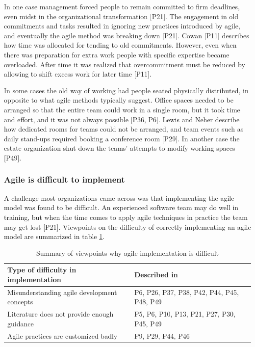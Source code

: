 \documentclass[preprint,authoryear,12pt]{elsarticle}
\begin{document}
In one case management forced people to remain committed to firm deadlines, even
midst in the organizational transformation [P21]. The engagement in old
commitments and tasks resulted in ignoring new practices introduced by agile,
and eventually the agile method was breaking down [P21].
Cowan [P11] describes how time was allocated for tending to old commitments.
However, even when there was preparation for extra work people with specific
expertise became overloaded. After time it was realized that overcommitment must
be reduced by allowing to shift excess work for later time [P11].



In some cases the old way of working had people seated physically distributed,
in opposite to what agile methods typically suggest. Office spaces needed to be
arranged so that the entire team could work in a single room, but it took time
and effort, and it was not always possible [P36, P6]. Lewis and Neher describe
how dedicated rooms for teams could not be arranged, and team events such as
daily stand-ups required booking a conference room [P29]. In another case the
estate organization shut down the teams' attempts to modify working spaces
[P49].


\subsubsection{Agile is difficult to implement}

A challenge most organizations came across was that implementing the agile model
was found to be difficult. An experienced software team may do well in training,
but when the time comes to apply agile techniques in practice the team may get
lost [P21]. Viewpoints on the difficulty of correctly implementing an agile
model are summarized in table \ref{table:challenges_difficulty}.


\begin{table}
    \centering
    \begin{tabular}{ >{\raggedright\arraybackslash}p{}
                     >{\raggedright\arraybackslash}p{} }
        \toprule
        Type of difficulty in implementation  &  Described in \\
        \midrule
        Misunderstanding agile development concepts  &
                P6, P26, P37, P38, P42, P44, P45, P48, P49      \\
        Literature does not provide enough guidance  &
                P5, P6, P10, P13, P21, P27, P30, P45, P49     \\
        Agile practices are customized badly   &
                P9, P29, P44, P46  \\
        \bottomrule
    \end{tabular}
    \caption{Summary of viewpoints why agile implementation is difficult}
    \label{table:challenges_difficulty}
\end{table}
\end{document}
